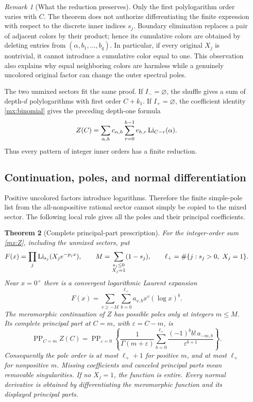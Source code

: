 \documentclass[11pt]{article}
\numberwithin{equation}{section}
\newtheorem{theorem}{Theorem}[section]
\theoremstyle{definition}
\theoremstyle{remark}
\newtheorem{remark}[theorem]{Remark}
\begin{document}
\begin{remark}[What the reduction preserves]
Only the first polylogarithm order varies with $C$.  The theorem does
not authorize differentiating the finite expression with respect to
the discrete inner indices $s_j$.  Boundary elimination replaces a
pair of adjacent colors by their product; hence its cumulative colors
are obtained by deleting entries from
$(\alpha,b_1,\ldots,b_q)$.  In particular, if every original $X_j$
is nontrivial, it cannot introduce a cumulative color equal to one.
This observation also explains why equal neighboring colors are
harmless while a genuinely uncolored original factor can change the
outer spectral poles.
\end{remark}

The two unmixed sectors fit the same proof.  If $I_-=\varnothing$,
the shuffle gives a sum of depth-$d$ polylogarithms with first order
$C+k_1$.  If $I_+=\varnothing$, the coefficient identity
\eqref{mx:binomial} gives the preceding depth-one formula
\[
 Z(C)=\sum_{\alpha,h}c_{\alpha,h}
                    \sum_{r=0}^{h-1}e_{h,r}\operatorname{Li}_{C-r}(\alpha).
\]
Thus every pattern of integer inner orders has a finite reduction.

\subsection{Continuation, poles, and normal differentiation}

Positive uncolored factors introduce logarithms.  Therefore the
finite simple-pole list from the all-nonpositive rational sector
cannot simply be copied to the mixed sector.  The following local
rule gives all the poles and their principal coefficients.

\begin{theorem}[Complete principal-part prescription]
\label{mx:poles}
For the integer-order sum \eqref{mx:Z}, including the unmixed sectors,
put
\[
 F(x)=\prod_j\operatorname{Li}_{s_j}(X_je^{-p_jx}),\qquad
 M=\sum_{\substack{s_j\leq0\\X_j=1}}(1-s_j),\qquad
 \ell_+=\#\{j:s_j>0,\ X_j=1\}.
\]
Near $x=0^+$ there is a convergent logarithmic Laurent expansion
\begin{equation}\label{mx:locallaurent}
 F(x)=\sum_{v\geq-M}\sum_{b=0}^{\ell_+} a_{v,b}x^v(\log x)^b.
\end{equation}
The meromorphic continuation of $Z$ has possible poles only at
integers $m\leq M$.  Its complete principal part at $C=m$, with
$\varepsilon=C-m$, is
\begin{equation}\label{mx:principal}
 \operatorname{PP}_{C=m}Z(C)
 =\operatorname{PP}_{\varepsilon=0}\left\{
  \frac1{\Gamma(m+\varepsilon)}
    \sum_{b=0}^{\ell_+}\frac{(-1)^bb!\,a_{-m,b}}
                        {\varepsilon^{b+1}}\right\}.
\end{equation}
Consequently the pole order is at most $\ell_++1$ for positive $m$, and
at most $\ell_+$ for nonpositive $m$.  Missing coefficients and canceled
principal parts mean removable singularities.  If no $X_j=1$,
the function is entire.  Every normal derivative is obtained by
differentiating the meromorphic function and its displayed principal
parts.
\end{theorem}
\end{document}
